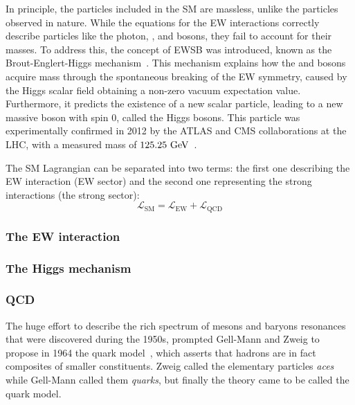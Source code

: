 In principle, the particles included in the \ac{SM} are massless, unlike the particles observed in nature. While the equations for the \ac{EW} interactions correctly describe particles like the photon, \Wboson, and \Zboson bosons, they fail to account for their masses. To address this, the concept of \ac{EWSB} was introduced, known as the Brout-Englert-Higgs mechanism~\cite{Higgs-1964_1,Higgs-1964_2,Higgs-1966,Englert_Brout-1964}. This mechanism explains how the \Wboson and \Zboson bosons acquire mass through the spontaneous breaking of the \ac{EW} symmetry, caused by the Higgs scalar field obtaining a non-zero vacuum expectation value. Furthermore, it predicts the existence of a new scalar particle, leading to a new massive boson with spin 0, called the Higgs bosons. This particle was experimentally confirmed in 2012 by the \ac{ATLAS} and \ac{CMS} collaborations at the \ac{LHC}, with a measured mass of \(125.25~\text{GeV}\)~\cite{ATLAS-HiggsObservation,CMS-HiggsObservation}.

The \ac{SM} Lagrangian can be separated into two terms: the first one describing the \ac{EW} interaction (\ac{EW} sector) and the second one representing the strong interactions (the strong sector):
\begin{equation*}
    \mathcal{L}_{\text{SM}} = \mathcal{L}_{\text{EW}} + \mathcal{L}_{\text{QCD}}
\end{equation*}








\subsubsection{The \acf{EW} interaction}


\subsubsection{The Higgs mechanism}


\subsubsection{\acf{QCD}}
\label{subsubsec:theory:sm:mathematical:qcd}

The huge effort to describe the rich spectrum of mesons and baryons resonances that were discovered during the 1950s, prompted Gell-Mann and Zweig to propose in 1964 the quark model~\cite{Gellmann-1964,Zweig-1964_1,Zweig-1964_2}, which asserts that hadrons are in fact composites of smaller constituents. Zweig called the elementary particles \textit{aces} while Gell-Mann called them \textit{quarks}, but finally the theory came to be called the quark model.

